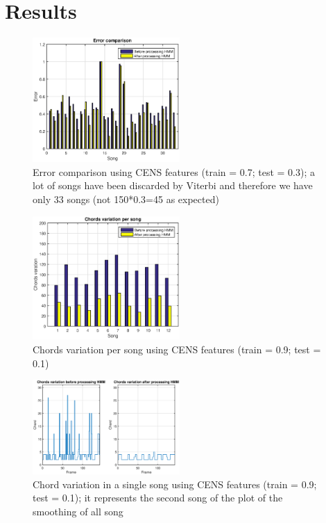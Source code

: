 \section{Results}
\label{sec:results}


\begin{figure} [h!]
	\includegraphics[width=0.5\textwidth]{img/Result_HMM/CENS/plot03071}
	\caption{Error comparison using CENS features (train = 0.7; test = 0.3); a lot of songs have been discarded by Viterbi and therefore we have only 33 songs (not 150*0.3=45 as expected)}
\end{figure}

\begin{figure} [h!]
	\includegraphics[width=0.5\textwidth]{img/Result_HMM/SMOOTHING/SmoothPerSongCENS0109}
	\caption{Chords variation per song using CENS features (train = 0.9; test = 0.1)}
\end{figure}

\begin{figure} [h!]
	\includegraphics[width=0.5\textwidth]{img/Result_HMM/SMOOTHING/SmoothSingleSongCENS0109}
	\caption{Chord variation in a single song using CENS features (train = 0.9; test = 0.1); it represents the second song of the plot of the smoothing of all song}
\end{figure}
